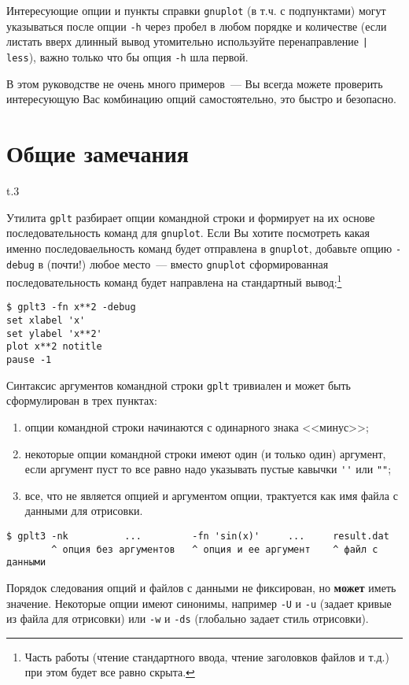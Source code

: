 \documentclass[12pt]{article}
\def\gplt{{\tt gplt}}
\def\gnuplot{{\tt gnuplot}}
\begin{document}
Интересующие опции и пункты справки \gnuplot{} (в т.ч. с подпунктами) могут указываться после опции \verb'-h' через пробел в любом порядке и количестве
(если листать вверх длинный вывод утомительно используйте перенаправление \verb'| less'), важно только что бы опция \verb'-h' шла первой.

В этом руководстве не очень много примеров~--- Вы всегда можете проверить интересующую Вас комбинацию опций самостоятельно, это быстро и безопасно. 

\section{Общие замечания}
\begin{wrapfigure}[5]{t}{.3\textwidth}
  \vphantom{.}
  \vspace{-3cm}

\end{wrapfigure}
Утилита \gplt{} разбирает опции командной строки и формирует на их основе последовательность команд для \gnuplot. Если Вы хотите посмотреть
какая именно последоваельность команд будет отправлена в \gnuplot, добавьте опцию \verb'-debug' в (почти!) любое место~--- вместо \gnuplot{}
сформированная последовательность команд будет направлена на стандартный вывод:\footnote{Часть работы
  (чтение стандартного ввода, чтение заголовков файлов и т.д.) при этом будет все равно скрыта.}
\begin{verbatim}
$ gplt3 -fn x**2 -debug
set xlabel 'x'
set ylabel 'x**2'
plot x**2 notitle   
pause -1
\end{verbatim}

Синтаксис аргументов командной строки \gplt{} тривиален и может быть сформулирован в трех пунктах:
\begin{enumerate}
\item опции командной строки начинаются с одинарного знака <<минус>>;
\item некоторые опции командной строки имеют один (и только один) аргумент, если аргумент пуст то все равно надо указывать пустые кавычки \verb|''| или \verb|""|;
\item все, что не является опцией и аргументом опции, трактуется как имя файла с данными для отрисовки.
\end{enumerate}
\begin{verbatim}
$ gplt3 -nk          ...         -fn 'sin(x)'     ...     result.dat
        ^ опция без аргументов   ^ опция и ее аргумент    ^ файл с данными
\end{verbatim}
Порядок следования опций и файлов с данными не фиксирован, но {\bf может} иметь значение.  Некоторые опции имеют синонимы, например \verb'-U' и \verb'-u'
(задает кривые из файла для отрисовки) или \verb'-w' и \verb'-ds' (глобально задает стиль отрисовки).
\end{document}
